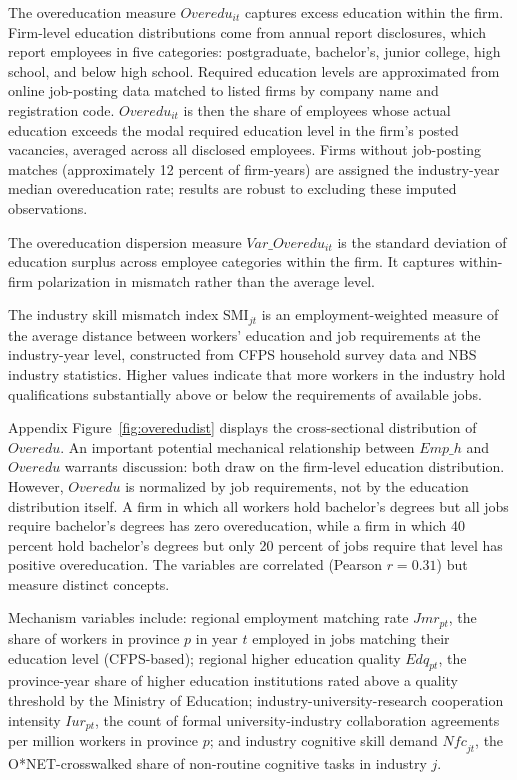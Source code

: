 \documentclass[12pt,a4paper]{article}
\theoremstyle{predstyle}
\theoremstyle{plain}
\newcommand{\SMI}{\mathrm{SMI}}
\newcommand{\Overedu}{\mathit{Overedu}}
\newcommand{\Jmr}{\mathit{Jmr}}
\newcommand{\Edq}{\mathit{Edq}}
\newcommand{\Nfc}{\mathit{Nfc}}
\begin{document}
\label{sec:mismatch_measure}

The overeducation measure \(\Overedu_{it}\) captures excess education within the firm. Firm-level education distributions come from annual report disclosures, which report employees in five categories: postgraduate, bachelor's, junior college, high school, and below high school. Required education levels are approximated from online job-posting data matched to listed firms by company name and registration code. \(\Overedu_{it}\) is then the share of employees whose actual education exceeds the modal required education level in the firm's posted vacancies, averaged across all disclosed employees. Firms without job-posting matches (approximately 12 percent of firm-years) are assigned the industry-year median overeducation rate; results are robust to excluding these imputed observations.

The overeducation dispersion measure \(Var\_\Overedu_{it}\) is the standard deviation of education surplus across employee categories within the firm. It captures within-firm polarization in mismatch rather than the average level.

The industry skill mismatch index \(\SMI_{jt}\) is an employment-weighted measure of the average distance between workers' education and job requirements at the industry-year level, constructed from CFPS household survey data and NBS industry statistics. Higher values indicate that more workers in the industry hold qualifications substantially above or below the requirements of available jobs.

Appendix Figure~\ref{fig:overedudist} displays the cross-sectional distribution of \(\Overedu\). An important potential mechanical relationship between \(Emp\_h\) and \(\Overedu\) warrants discussion: both draw on the firm-level education distribution. However, \(Overedu\) is normalized by job requirements, not by the education distribution itself. A firm in which all workers hold bachelor's degrees but all jobs require bachelor's degrees has zero overeducation, while a firm in which 40 percent hold bachelor's degrees but only 20 percent of jobs require that level has positive overeducation. The variables are correlated (Pearson $r = 0.31$) but measure distinct concepts.

Mechanism variables include: regional employment matching rate \(\Jmr_{pt}\), the share of workers in province \(p\) in year \(t\) employed in jobs matching their education level (CFPS-based); regional higher education quality \(\Edq_{pt}\), the province-year share of higher education institutions rated above a quality threshold by the Ministry of Education; industry-university-research cooperation intensity \(\mathit{Iur}_{pt}\), the count of formal university-industry collaboration agreements per million workers in province \(p\); and industry cognitive skill demand \(\Nfc_{jt}\), the O*NET-crosswalked share of non-routine cognitive tasks in industry \(j\).
\end{document}
